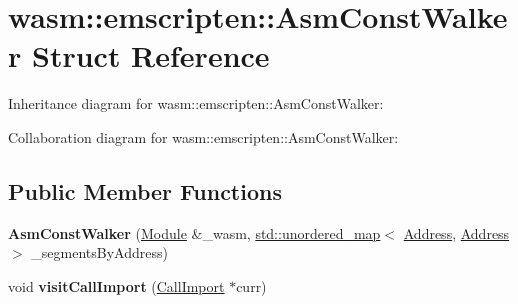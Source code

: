 \hypertarget{structwasm_1_1emscripten_1_1_asm_const_walker}{}\section{wasm\+:\+:emscripten\+:\+:Asm\+Const\+Walker Struct Reference}
\label{structwasm_1_1emscripten_1_1_asm_const_walker}


Inheritance diagram for wasm\+:\+:emscripten\+:\+:Asm\+Const\+Walker\+:


Collaboration diagram for wasm\+:\+:emscripten\+:\+:Asm\+Const\+Walker\+:
\subsection*{Public Member Functions}
\begin{DoxyCompactItemize}
\item 
\mbox{\label{structwasm_1_1emscripten_1_1_asm_const_walker_a93e4470b2e617939f34baf8e4ac3d7d5}} 
{\bfseries Asm\+Const\+Walker} (\mbox{\hyperlink{classwasm_1_1_module}{Module}} \&\+\_\+wasm, \mbox{\hyperlink{classstd_1_1unordered__map}{std\+::unordered\+\_\+map}}$<$ \mbox{\hyperlink{structwasm_1_1_address}{Address}}, \mbox{\hyperlink{structwasm_1_1_address}{Address}} $>$ \+\_\+segments\+By\+Address)
\item 
\mbox{\label{structwasm_1_1emscripten_1_1_asm_const_walker_aeb97016af5f55a0fd4a1434bf2874a95}} 
void {\bfseries visit\+Call\+Import} (\mbox{\hyperlink{classwasm_1_1_call_import}{Call\+Import}} $\ast$curr)
\end{DoxyCompactItemize}
